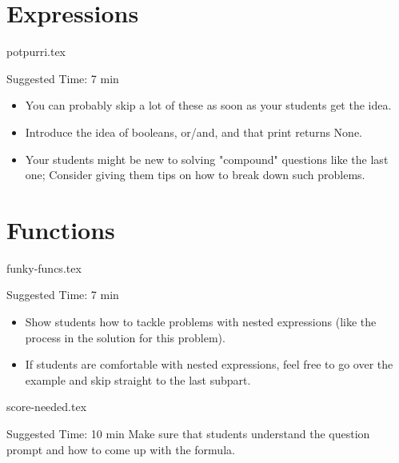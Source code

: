 \documentclass{exam}
\begin{document}
\section{Expressions}
\begin{questions}
    {potpurri.tex}
    \begin{questionmeta}
        Suggested Time: 7 min
        \begin{itemize}
            \item You can probably skip a lot of these as soon as your students get the idea.
            \item Introduce the idea of booleans, or/and, and that print returns None.
            \item Your students might be new to solving "compound" questions like the last one; Consider giving them tips on how to break down such problems.
        \end{itemize}
    \end{questionmeta}
\end{questions}


\section{Functions}
\begin{questions}
    {funky-funcs.tex}
    \begin{questionmeta}
        Suggested Time: 7 min
        \begin{itemize}
            \item Show students how to tackle problems with nested expressions (like the process in the solution for this problem).
            \item If students are comfortable with nested expressions, feel free to go over the example and skip straight to the last subpart. 
        \end{itemize}
    \end{questionmeta}

    {score-needed.tex}
    \begin{questionmeta}
    Suggested Time: 10 min
    Make sure that students understand the question prompt and how to come up with the formula.
    \end{questionmeta}  
\end{questions}
\end{document}
